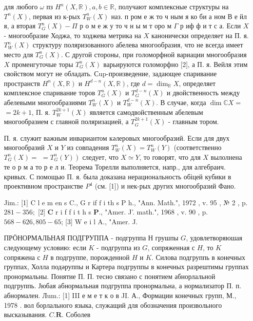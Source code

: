 \documentclass[10pt]{article}
\begin{document}
для любого $\omega$ пз $H^{n}(X, \mathbb{R}), a, b \in \mathbb{R}$, получают комплексные структуры на $T^{n}(X)$, первая из к-рых $T_{W}^{n}(X)$ наз. п ром е ж то ч ным я ко би а ном В е йл я, а вторая $T_{G}^{n}(X)-\Pi$ р о м е ж у то ч н ы м т оро м $\Gamma$ р иф ф и т с а. Если $X$ - многообразие Ходжа, то ходжева метрика на $X$ канонически определяет на П. я. $T_{W}^{n}(X)$ структуру поляризованного абелева многообразия, что не всегда имеет место для $T_{G}^{n}(X)$. С другой стороны, при голоморфной вариации многообразия $X$ променгуточые торы $T_{G}^{n}(X)$ варьируются голоморфно [2], а П. я. Вейля этим свойством могут не обладать. Сup-произведение, задающее спаривание пространств $H^{n}(X, \mathbb{R})$ и $H^{d-n}(X, \mathbb{R})$, где $d=\operatorname{dim}_{\mathbb{R}} X$, определяет комплексное спаривание торов $T_{G}^{n}(X)$ и $T_{G}^{d-n}(X)$ и двойственность между абелевыми многообразиями $T_{W}^{n}(X)$ и $T_{W}^{d-n}(X)$. В случае, когда $\operatorname{dim} \mathbb{C} X=$ $=2 k+1$, П. я. $T_{W}^{2 k+1}(X)$ является самодвойственным абелевым многообразием с главной поляризацией, а $T_{G}^{2 k+1}(X)$ - главным тором.



П. я. служит важным инвариантом кәлеровых многообразий. Если для двух многообразий $X$ и $Y$ из совпадения $T_{W}^{n}(X)=T_{W}^{n}(Y)$ (соответственно $T_{G}^{n}(X)=$ $\left.=T_{G}^{n}(Y)\right)$ следует, что $X \simeq Y$, то говорят, что для $X$ вылолнена те о р м а то р е л и. Теорема Торелли выполняется, напр., для алгебраич. кривых. С помощью П. я. была доказана нерациональность обіцей кубики в проективном пространстве $P^{4}$ (см. [1]) и нек-рых других многообразий Фано.



Jim.: [1] C l e m en s C., G $\mathrm{r}$ if $\mathrm{f}$ i $\mathrm{t} \mathrm{h}$ s $\mathrm{P}$ h., "Ann. Math.", 1972 , v. 95 , № 2 , p. $281-356 ;$ [2] $\mathbf{C}$ r i f f i t h s $\mathbf{P}$., "Amer. J'. math.", 1968 , v. 90 , p. $568-626,805-65$; [3] W e i l A., "Amer. J.



ПРӦНОРМАЛЬНАЯ ПОДГРУППА - подгруппа Н грушпы $G$, удовлетворяюшая следующему условию: если $K$ - подгруппа из $G$, сопряженная с $H$, то $K$ сопряжена с $H$ в подгруппе, порожденной $H$ и $K$. Силова подгруппь в конечных группах, Холла подәруппы и Картера подгруппы в конечных разрештимы группах пронормальны. Понятие П. П. тесно связано с понятием абнорлальной подгруппь. Јюбая абнормальная подгруппа пронормальна, а нормализатор П. п. абнормален. Лum.: [1] III е м е т к о в JI. А., Формации конечных групп, М., 1978 . вол борлального языка, служащий для обозначения произвольного высказывания. $C . \boldsymbol{R}$. Соболев
\end{document}
